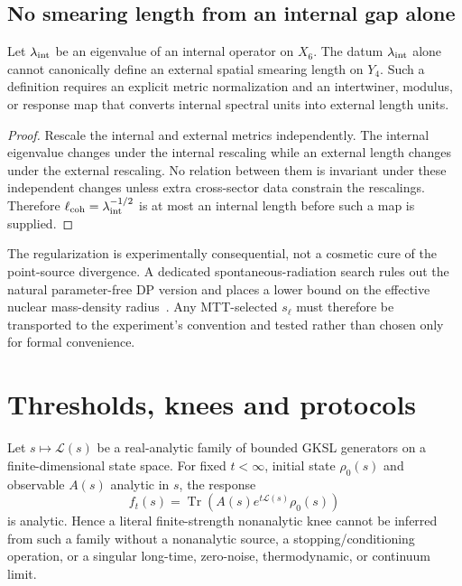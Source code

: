 \documentclass[11pt]{article}
\DeclareMathOperator{\Tr}{Tr}
\newcommand{\cL}{\mathcal L}
\begin{document}
\subsection{No smearing length from an internal gap alone}

\begin{proposition}\label{prop:scale}
Let $\lambda_{\rm int}$ be an eigenvalue of an internal operator on $X_6$. The datum
$\lambda_{\rm int}$ alone cannot canonically define an external spatial smearing
length on $Y_4$. Such a definition requires an explicit metric normalization and an
intertwiner, modulus, or response map that converts internal spectral units into
external length units.
\end{proposition}

\begin{proof}
Rescale the internal and external metrics independently. The internal eigenvalue
changes under the internal rescaling while an external length changes under the
external rescaling. No relation between them is invariant under these independent
changes unless extra cross-sector data constrain the rescalings. Therefore
$\ell_{\rm coh}=\lambda_{\rm int}^{-1/2}$ is at most an internal length before such
a map is supplied.
\end{proof}

The regularization is experimentally consequential, not a cosmetic cure of the
point-source divergence. A dedicated spontaneous-radiation search rules out the
natural parameter-free DP version and places a lower bound on the effective nuclear
mass-density radius~\cite{Donadi2021}. Any MTT-selected $s_\ell$ must therefore be
transported to the experiment's convention and tested rather than chosen only for
formal convenience.

\section{Thresholds, knees and protocols}

\begin{theorem}\label{thm:analytic}
Let $s\mapsto\cL(s)$ be a real-analytic family of bounded GKSL generators on a
finite-dimensional state space. For fixed $t<\infty$, initial state $\rho_0(s)$ and
observable $A(s)$ analytic in $s$, the response
\[
 f_t(s)=\Tr\!\left(A(s)e^{t\cL(s)}\rho_0(s)\right)
\]
is analytic. Hence a literal finite-strength nonanalytic knee cannot be inferred
from such a family without a nonanalytic source, a stopping/conditioning operation,
or a singular long-time, zero-noise, thermodynamic, or continuum limit.
\end{theorem}
\end{document}
